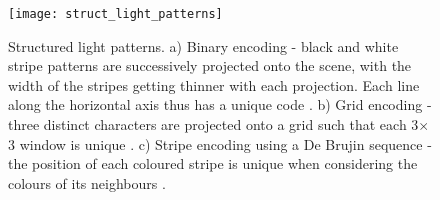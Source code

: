 \documentclass[class=article, crop=false]{standalone}
\begin{document}
\begin{figure}[!t]
	\centering
	\texttt{[image: struct\_light\_patterns]}
	\caption{Structured light patterns. a) Binary encoding - black and white stripe patterns are successively projected onto the scene, with the width of the stripes getting thinner with each projection. Each line along the horizontal axis thus has a unique code \parencite{Geng2011}. b) Grid encoding - three distinct characters are projected onto a grid such that each 3$\times$3 window is unique \parencite{Albitar2006}. c) Stripe encoding using a De Brujin sequence - the position of each coloured stripe is unique when considering the colours of its neighbours \parencite{Zhang2002}. }\vspace*{-10pt}
	\label{struct_patterns}
\end{figure}
\end{document}
